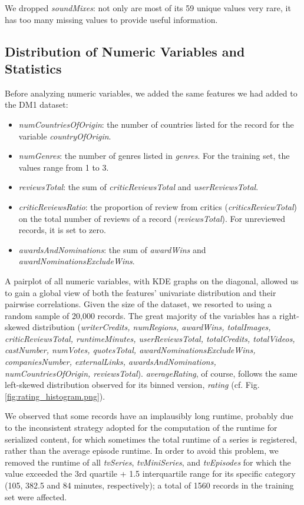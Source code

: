 We dropped \textit{soundMixes}: not only are most of its 59 unique values very rare, it has too many missing values to provide useful information.


\subsection{Distribution of Numeric Variables and Statistics}
\label{numeric_vars_analysis}
Before analyzing numeric variables, we added the same features we had added to the DM1 dataset:
\begin{itemize}
    \item \textit{numCountriesOfOrigin}: the number of countries listed for the record for the variable \textit{countryOfOrigin}.
    \item \textit{numGenres}: the number of genres listed in \textit{genres}. For the training set, the values range from 1 to 3.
    \item \textit{reviewsTotal}: the sum of \textit{criticReviewsTotal} and \textit{userReviewsTotal}.
    \item \textit{criticReviewsRatio}: the proportion of review from critics (\textit{criticsReviewTotal}) on the total number of reviews of a record (\textit{reviewsTotal}). For unreviewed records, it is set to zero.
    \item \textit{awardsAndNominations}: the sum of \textit{awardWins} and \textit{awardNominationsExcludeWins}.
\end{itemize}

A pairplot of all numeric variables, with KDE graphs on the diagonal, allowed us to gain a global view of both the features' univariate distribution and their pairwise correlations. Given the size of the dataset, we resorted to using a random sample of 20,000 records.
The great majority of the variables has a right-skewed distribution (\textit{writerCredits, numRegions, awardWins, totalImages, criticReviewsTotal, runtimeMinutes, userReviewsTotal, totalCredits, totalVideos, castNumber, numVotes, quotesTotal, awardNominationsExcludeWins, companiesNumber, externalLinks, awardsAndNominations, numCountriesOfOrigin, reviewsTotal}).
\textit{averageRating}, of course, follows the same left-skewed distribution observed for its binned version, \textit{rating} (cf. Fig. \ref{fig:rating_histogram.png}).

We observed that some records have an implausibly long runtime, probably due to the inconsistent strategy adopted for the computation of the runtime for serialized content, for which sometimes the total runtime of a series is registered, rather than the average episode runtime.
In order to avoid this problem, we removed the runtime of all \textit{tvSeries}, \textit{tvMiniSeries}, and \textit{tvEpisodes} for which the value exceeded the 3rd quartile + 1.5 interquartile range for its specific category (105, 382.5 and 84 minutes, respectively); a total of 1560 records in the training set were affected.


